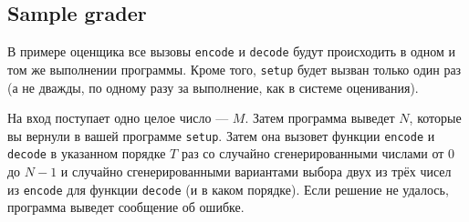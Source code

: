 \documentclass[12pt]{article}
\begin{document}
\subsection{Sample grader}

В примере оценщика все вызовы \texttt{encode} и \texttt{decode} будут происходить в одном и том же выполнении программы. Кроме того, \texttt{setup} будет вызван только один раз (а не дважды, по одному разу за выполнение, как в системе оценивания).

На вход поступает одно целое число — $M$. Затем программа выведет $N$, которые вы вернули в вашей программе \texttt{setup}. Затем она вызовет функции \texttt{encode} и \texttt{decode} в указанном порядке $T$ раз со случайно сгенерированными числами от $0$ до $N-1$ и случайно сгенерированными вариантами выбора двух из трёх чисел из \texttt{encode} для функции \texttt{decode} (и в каком порядке). Если решение не удалось, программа выведет сообщение об ошибке.
\end{document}
